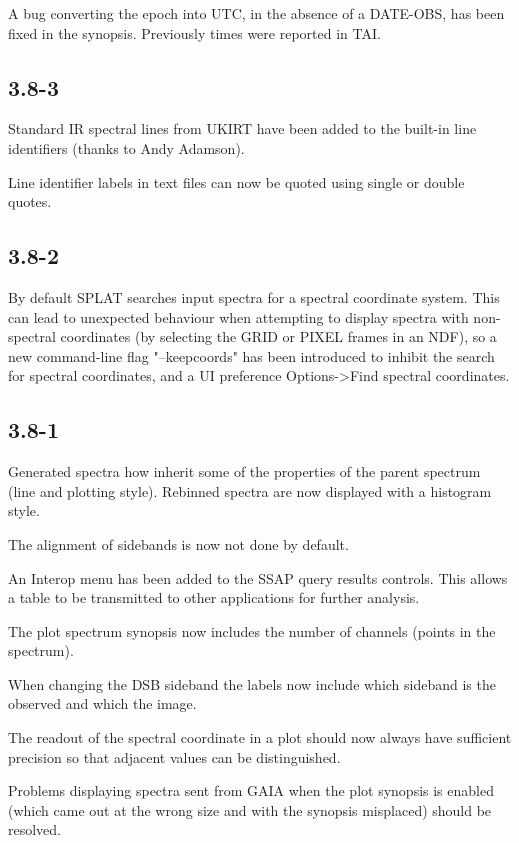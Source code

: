 \documentclass[twoside,11pt]{article}
\renewcommand{\_}{\texttt{\symbol{95}}}
\begin{document}
A bug converting the epoch into UTC, in the absence of a DATE-OBS, has been
fixed in the synopsis. Previously times were reported in TAI.

\subsection{3.8-3}

Standard IR spectral lines from UKIRT have been added to the built-in
line identifiers (thanks to Andy Adamson).

Line identifier labels in text files can now be quoted using single
or double quotes.

\subsection{3.8-2}

By default SPLAT searches input spectra for a spectral coordinate system.
This can lead to unexpected behaviour when attempting to display spectra with
non-spectral coordinates (by selecting the GRID or PIXEL frames in an NDF), so
a new command-line flag "--keepcoords" has been introduced to inhibit the
search for spectral coordinates, and a UI preference Options->Find spectral
coordinates.

\subsection{3.8-1}

Generated spectra how inherit some of the properties of the parent spectrum
(line and plotting style).  Rebinned spectra are now displayed with a
histogram style.

The alignment of sidebands is now not done by default.

An Interop menu has been added to the SSAP query results controls.  This
allows a table to be transmitted to other applications for further analysis.

The plot spectrum synopsis now includes the number of channels (points in the
spectrum).

When changing the DSB sideband the labels now include which sideband is the
observed and which the image.

The readout of the spectral coordinate in a plot should now always have
sufficient precision so that adjacent values can be distinguished.

Problems displaying spectra sent from GAIA when the plot synopsis is enabled
(which came out at the wrong size and with the synopsis misplaced) should be
resolved.
\end{document}
